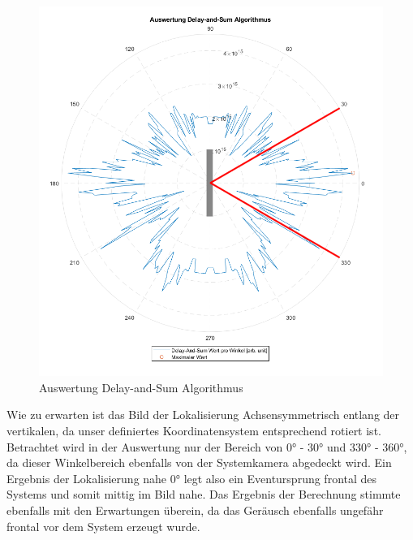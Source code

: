 \begin{figure}[h]
	\begin{center}
		\includegraphics[scale=0.1]{Sections/Tests/Test_6_b}
	\end{center}
	\caption{Auswertung Delay-and-Sum Algorithmus}
	\label{fig:Test_6_b}
\end{figure}

Wie zu erwarten ist das Bild der Lokalisierung Achsensymmetrisch entlang der vertikalen, da unser definiertes Koordinatensystem entsprechend rotiert ist. Betrachtet wird in der Auswertung nur der Bereich von \ang{0} - \ang{30} und \ang{330} - \ang{360}, da dieser Winkelbereich ebenfalls von der Systemkamera abgedeckt wird. Ein Ergebnis der Lokalisierung nahe \ang{0} legt also ein Eventursprung frontal des Systems und somit mittig im Bild nahe. Das Ergebnis der Berechnung stimmte ebenfalls mit den Erwartungen überein, da das Geräusch ebenfalls ungefähr frontal vor dem System erzeugt wurde.

